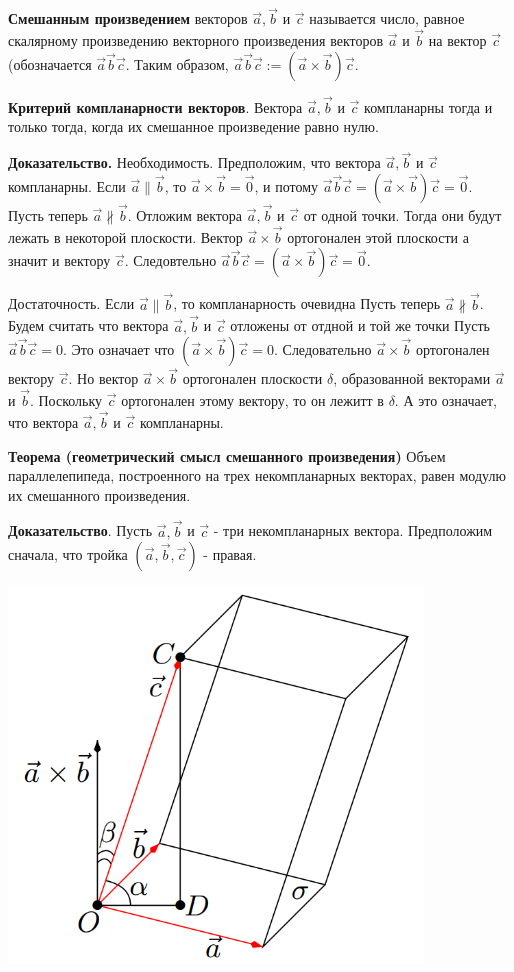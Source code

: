 \documentclass[a4paper]{article}
\begin{document}
\textbf{Смешанным произведением} векторов $\vec{a}, \vec{b}$ и $\vec{c}$ называется число, равное
скалярному произведению векторного произведения векторов $\vec{a}$ и $\vec{b}$
на вектор $\vec{c}$ (обозначается $\vec{a} \vec{b} \vec{c}$.
Таким образом, $\vec{a} \vec{b} \vec{c} := (\vec{a} \times \vec{b}) \vec{c}$.

\textbf{Критерий компланарности векторов}. Вектора $\vec{a}, \vec{b}$ и $\vec{c}$ компланарны тогда и только тогда, когда их смешанное
произведение равно нулю.

\textbf{Доказательство.} Необходимость. Предположим, что вектора $\vec{a}, \vec{b}$ и $\vec{c}$ компланарны. Если $\vec{a} \parallel \vec{b}$, то $\vec{a} \times \vec{b} = \vec{0}$, и потому $\vec{a} \vec{b} \vec{c} = (\vec{a} \times \vec{b} ) \vec{c} = \vec{0}$. \\
Пусть теперь $\vec{a} \nparallel \vec{b}$. Отложим вектора $\vec{a}, \vec{b}$ и $\vec{c}$ от одной точки. Тогда они будут лежать в некоторой плоскости. Вектор $\vec{a} \times \vec{b}$ ортогонален этой плоскости а значит и вектору $\vec{c}$. Следовтельно $\vec{a} \vec{b} \vec{c} = (\vec{a} \times \vec{b} ) \vec{c} = \vec{0}$.

Достаточность. Если $\vec{a} \parallel \vec{b}$, то компланарность очевидна Пусть теперь $\vec{a} \nparallel \vec{b}$. Будем считать что вектора $\vec{a}, \vec{b}$ и $\vec{c}$ отложены от отдной и той же точки Пусть $\vec{a} \vec{b} \vec{c} = 0$. Это означает что $(\vec{a} \times \vec{b}) \vec{c} = 0$. Следовательно $\vec{a} \times \vec{b}$ ортогонален вектору $\vec{c}$. Но вектор $\vec{a} \times \vec{b}$ ортогонален плоскости $\delta$, образованной векторами $\vec{a}$ и $\vec{b}$. Поскольку $\vec{c}$ ортогонален этому вектору, то он лежитт в $\delta$. А это означает, что вектора $\vec{a}, \vec{b}$ и $\vec{c}$ компланарны.

\textbf{Теорема  (геометрический смысл смешанного произведения)} Объем параллелепипеда, построенного на трех некомпланарных векторах,
равен модулю их смешанного произведения.

\textbf{Доказательство}. Пусть $\vec{a}, \vec{b}$ и $\vec{c}$ - три некомпланарных вектора. Предположим сначала, что тройка $(\vec{a}, \vec{b}, \vec{c})$ - правая. 

\includegraphics[width=11cm]{t4}
\end{document}
